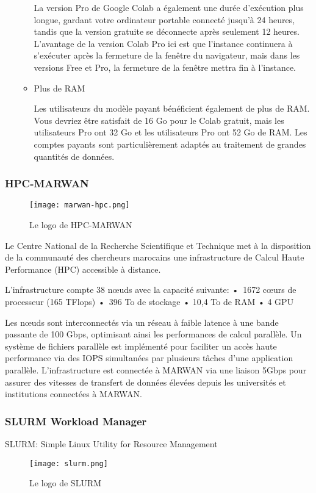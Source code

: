\begin{enumerate}
\begin{itemize}[label=$\bullet$]
            La version Pro de Google Colab a également une durée d'exécution plus longue, gardant votre ordinateur portable connecté jusqu'à 24 heures, tandis que la version gratuite se déconnecte après seulement 12 heures. 
            L'avantage de la version Colab Pro ici est que l'instance continuera à s'exécuter  après la fermeture de la fenêtre du navigateur, mais dans les versions Free et Pro, la fermeture de la fenêtre mettra fin à l'instance. 
            \item Plus de RAM
            
            Les utilisateurs du modèle payant bénéficient également de plus de RAM. Vous devriez être satisfait de 16 Go pour le Colab gratuit, mais les utilisateurs Pro ont 32 Go et les utilisateurs Pro ont  52 Go de RAM. Les comptes payants sont particulièrement adaptés au traitement de grandes quantités de données.
        \end{itemize}
        
       
        \bfseries
    \end{enumerate}
    \subsubsection{HPC-MARWAN}
    \begin{figure}[H]
        \centering
        \texttt{[image: marwan-hpc.png]}
        \caption{Le logo de HPC-MARWAN}\label{fig:marwan-hpc}
    \end{figure}
    Le Centre National de la Recherche Scientifique et Technique met à la disposition de la communauté des chercheurs marocains une infrastructure de Calcul Haute Performance (HPC) accessible à distance.

    L'infrastructure compte 38 nœuds avec la capacité suivante:
    • 1672 cœurs de processeur (165 TFlops)
    • 396 To de stockage
    • 10,4 To de RAM
    • 4 GPU

    Les nœuds sont interconnectés via un réseau à faible latence à une bande passante de 100 Gbps, optimisant ainsi les performances de calcul parallèle. Un système de fichiers parallèle est implémenté pour faciliter un accès haute performance via des IOPS simultanées par plusieurs tâches d'une application parallèle.
    L'infrastructure est connectée à MARWAN via une liaison 5Gbps pour assurer des vitesses de transfert de données élevées depuis les universités et institutions connectées à MARWAN.

    \subsubsection*{SLURM Workload Manager}
    SLURM: Simple Linux Utility for Resource Management
    \begin{figure}[H]
        \centering
        \texttt{[image: slurm.png]}
        \caption{Le logo de SLURM}\label{fig:slurm}
    \end{figure}

